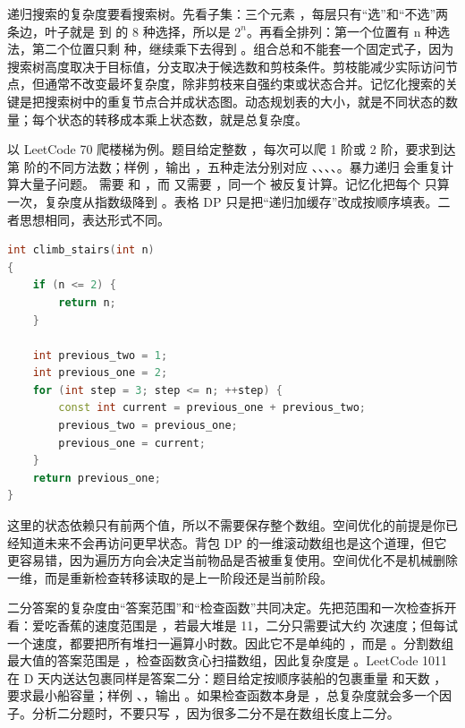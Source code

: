 递归搜索的复杂度要看搜索树。先看子集：三个元素 \code{[a,b,c]}，每层只有“选”和“不选”两条边，叶子就是  到  的 8 种选择，所以是 \ensuremath{2^n}。再看全排列：第一个位置有 n 种选法，第二个位置只剩  种，继续乘下去得到 。组合总和不能套一个固定式子，因为搜索树高度取决于目标值，分支取决于候选数和剪枝条件。剪枝能减少实际访问节点，但通常不改变最坏复杂度，除非剪枝来自强约束或状态合并。记忆化搜索的关键是把搜索树中的重复节点合并成状态图。动态规划表的大小，就是不同状态的数量；每个状态的转移成本乘上状态数，就是总复杂度。

以 LeetCode 70 爬楼梯为例。题目给定整数 ，每次可以爬 1 阶或 2 阶，要求到达第  阶的不同方法数；样例 ，输出 ，五种走法分别对应 、、、、。暴力递归  会重复计算大量子问题。  需要  和 ，而  又需要 ，同一个  被反复计算。记忆化把每个  只算一次，复杂度从指数级降到 。表格 DP 只是把“递归加缓存”改成按顺序填表。二者思想相同，表达形式不同。

\begin{lstlisting}[language=C++,caption={LeetCode 70 爬楼梯：从重复递归到滚动状态}]
int climb_stairs(int n)
{
    if (n <= 2) {
        return n;
    }

    int previous_two = 1;
    int previous_one = 2;
    for (int step = 3; step <= n; ++step) {
        const int current = previous_one + previous_two;
        previous_two = previous_one;
        previous_one = current;
    }
    return previous_one;
}
\end{lstlisting}

这里的状态依赖只有前两个值，所以不需要保存整个数组。空间优化的前提是你已经知道未来不会再访问更早状态。背包 DP 的一维滚动数组也是这个道理，但它更容易错，因为遍历方向会决定当前物品是否被重复使用。空间优化不是机械删除一维，而是重新检查转移读取的是上一阶段还是当前阶段。

二分答案的复杂度由“答案范围”和“检查函数”共同决定。先把范围和一次检查拆开看：爱吃香蕉的速度范围是 \code{[1, maxPile]}，若最大堆是 11，二分只需要试大约  次速度；但每试一个速度，都要把所有堆扫一遍算小时数。因此它不是单纯的 ，而是 。分割数组最大值的答案范围是 ，检查函数贪心扫描数组，因此复杂度是 。LeetCode 1011 在 D 天内送达包裹同样是答案二分：题目给定按顺序装船的包裹重量  和天数 ，要求最小船容量；样例 、，输出 。如果检查函数本身是 ，总复杂度就会多一个因子。分析二分题时，不要只写 ，因为很多二分不是在数组长度上二分。

